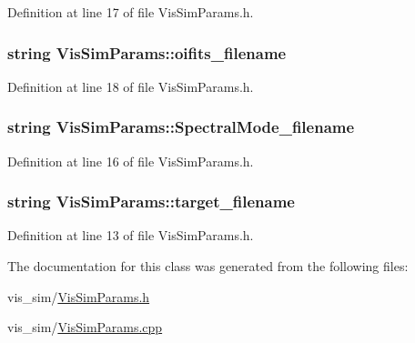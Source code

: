 Definition at line 17 of file VisSimParams.h.

\hypertarget{classVisSimParams_ab5550741409f4dbfe5d601194fe7be4b}{
\subsubsection[{oifits\_\-filename}]{\setlength{\rightskip}{0pt plus 5cm}string {\bf VisSimParams::oifits\_\-filename}}}
\label{classVisSimParams_ab5550741409f4dbfe5d601194fe7be4b}


Definition at line 18 of file VisSimParams.h.

\hypertarget{classVisSimParams_a5b4b6a34093cd8d538fa32e159477d8e}{
\subsubsection[{SpectralMode\_\-filename}]{\setlength{\rightskip}{0pt plus 5cm}string {\bf VisSimParams::SpectralMode\_\-filename}}}
\label{classVisSimParams_a5b4b6a34093cd8d538fa32e159477d8e}


Definition at line 16 of file VisSimParams.h.

\hypertarget{classVisSimParams_a225b522f1b7e0e07bb3745456693d84d}{
\subsubsection[{target\_\-filename}]{\setlength{\rightskip}{0pt plus 5cm}string {\bf VisSimParams::target\_\-filename}}}
\label{classVisSimParams_a225b522f1b7e0e07bb3745456693d84d}


Definition at line 13 of file VisSimParams.h.



The documentation for this class was generated from the following files:\begin{DoxyCompactItemize}
\item 
vis\_\-sim/\hyperlink{VisSimParams_8h}{VisSimParams.h}\item 
vis\_\-sim/\hyperlink{VisSimParams_8cpp}{VisSimParams.cpp}\end{DoxyCompactItemize}
